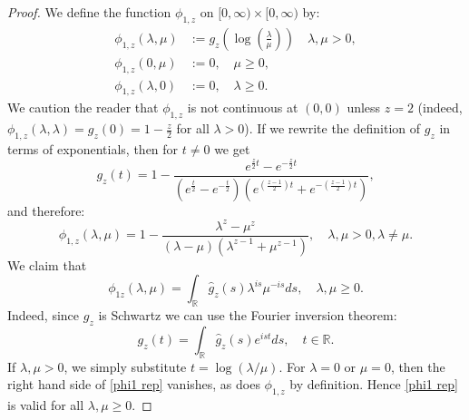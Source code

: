     \begin{proof}
        We define the function $\phi_{1,z}$ on $[0,\infty)\times [0,\infty)$ by:
        \begin{align*}
            \phi_{1,z}(\lambda,\mu) &:= g_z(\log(\frac{\lambda}{\mu})) \quad  \lambda,\mu>0,\\
                  \phi_{1,z}(0,\mu) &:= 0,\quad \mu\geq 0,\\
              \phi_{1,z}(\lambda,0) &:= 0,\quad \lambda\geq 0.
        \end{align*}
        We caution the reader that $\phi_{1,z}$ is not continuous at $(0,0)$ unless $z=2$ (indeed, $\phi_{1,z}(\lambda,\lambda)=g_z(0)=1-\frac{z}{2}$ for all $\lambda>0$).
        If we rewrite the definition of $g_z$ in terms of exponentials,
        then for $t \neq 0$ we get
        \begin{equation*}
            g_z(t) = 1-\frac{e^{\frac{z}{2}t}-e^{-\frac{z}{2}t}}{(e^{\frac{t}{2}}-e^{-\frac{t}{2}})(e^{\left(\frac{z-1}{2}\right)t}+e^{-\left(\frac{z-1}{2}\right)t})},
        \end{equation*}        
        and therefore:
        \begin{equation}\label{phi1 alg}
            \phi_{1,z}(\lambda,\mu) = 1-\frac{\lambda^z-\mu^z}{(\lambda-\mu)(\lambda^{z-1}+\mu^{z-1})},\quad \lambda,\mu>0, \lambda\neq \mu.
        \end{equation}
        We claim that
        \begin{equation}\label{phi1 rep}
            \phi_{1z}(\lambda,\mu) = \int_{\mathbb{R}}\widehat{g}_z(s)\lambda^{is}\mu^{-is}ds,\quad\lambda,\mu\geq0.
        \end{equation}
        Indeed, since $g_z$ is Schwartz we can use the Fourier inversion theorem:
        \begin{equation*}
            g_z(t)=\int_{\mathbb{R}}\widehat{g}_z(s)e^{ist}ds,\quad t\in\mathbb{R}.
        \end{equation*}
        If $\lambda,\mu > 0$, we simply substitute $t = \log(\lambda/\mu)$. For $\lambda = 0$ or $\mu = 0$, then the right hand side of \eqref{phi1 rep} vanishes,
        as does $\phi_{1,z}$ by definition. Hence \eqref{phi1 rep} is valid for all $\lambda,\mu \geq 0$.
        


\end{proof}
